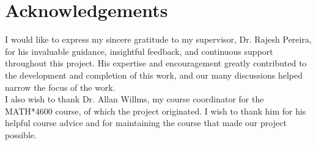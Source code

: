 \documentclass[12pt]{amsart}
\numberwithin{figure}{section}
\theoremstyle{plain}
\begin{document}
\section{Acknowledgements}
\indent I would like to express my sincere gratitude to my supervisor, Dr. Rajesh Pereira, for his invaluable guidance, insightful feedback, and continuous support throughout this project. His expertise and encouragement greatly contributed to the development and completion of this work, and our many discussions helped narrow the focus of the work.\\
\indent I also wish to thank Dr. Allan Willms, my course coordinator for the  MATH*4600 course, of which the project originated. I wish to thank him for his helpful course advice and for maintaining the course that made our project possible.


\end{document}
